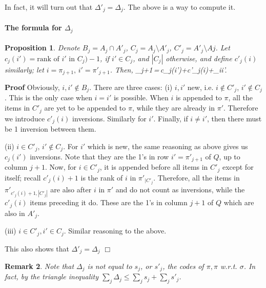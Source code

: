 \documentclass[10pt]{article}
\newtheorem{prop}{Proposition}
\newtheorem{remark}[prop]{Remark}
\begin{document}
In fact, it will turn out that $\Delta'_j=\Delta_j$. The above is a way to compute it.

\paragraph{The formula for $\Delta_j$}
%
\begin{prop} Denote $B_j=A_j\cap A'_j$, $C_j=A_j\setminus A'_j$, $C'_j=A'_j\setminus Aj$. Let $c_j(i')=\text{rank of $i'$ in $C_j$})-1$, if $i'\in C_j$, and $|C_j|$ otherwise, and define $c'_j(i)$ similarly; let $i=\pi_{j+1},\,i'=\pi'_{j+1}$.  Then,
  \beq \Delta_{j+1}\,=\,c_j(i')+c'_j(i)+\delta_{ii'}.  \eeq
\end{prop}
%
    {\bf Proof} Obviously, $i,i'\not\in B_j$. There are three cases:
    (i) $i,i'$ new, i.e. $i\not\in C'_j$, $i'\not\in C_j$. This is the only case when $i=i'$ is possible. When $i$ is appended to $\pi$, all the items in $C'_j$ are yet to be appended to $\pi$, while they are already in $\pi'$. Therefore we introduce $c'_j(i)$ inversions. Similarly for $i'$. Finally, if $i\neq i'$, then there must be 1 inversion between them.

    (ii) $i\in C'_j,\,i'\not\in C_j$. For $i'$ which is new, the same reasoning as above gives us $c_j(i')$ inversions. Note that they are the 1's in row $i'=\pi'_{j+1}$ of $Q$, up to column $j+1$. Now, for $i\in C'_j$, it is appended before all items in $C'_j$ except for itself; recall $c'_j(i)+1$ is the rank of $i$ in $\pi'_{|C'_j}$. Therefore, all the items in $\pi'_{c'_j(i)+1,|C'_j|}$ are also after $i$ in $\pi'$ and do not count as inversions, while the $c'_j(i)$ items preceding it do. These are the 1's in column $j+1$ of $Q$ which are also in $A'_j$. 

    (iii) $i\in C'_j,i'\in C_j$. Similar reasoning to the above.

    This also shows that $\Delta'_j=\Delta_j$ $\Box$
\begin{remark} Note that $\Delta_j$ is not equal to $s_j$, or $s'_j$, the codes of $\pi,\pi$ w.r.t. $\sigma$. In fact, by the triangle inequality $\sum_j\Delta_j\leq \sum_j s_j +\sum_j s'_j$.  
      \end{remark}

    
\end{document}

